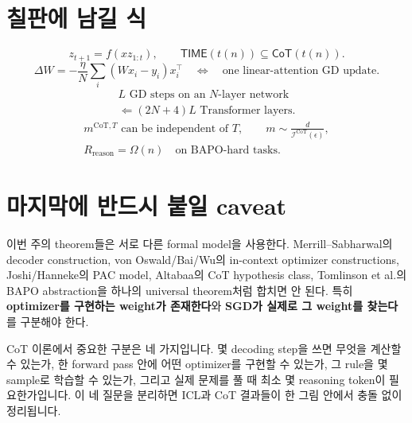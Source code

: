 \documentclass[11pt,a4paper,oneside,openany]{memoir}
\newcommand{\CoT}{\mathsf{CoT}}
\newcommand{\TIME}{\mathsf{TIME}}
\newcommand{\Icot}{\mathcal{I}^{\mathrm{CoT}}}
\theoremstyle{definition}
\begin{document}
\section{칠판에 남길 식}

\[
z_{t+1}=f(xz_{1:t}),
\qquad
\TIME(t(n))\subseteq\CoT(t(n)).
\]
\[
\Delta W
=-\frac{\eta}{N}\sum_i(Wx_i-y_i)x_i^\top
\quad\Longleftrightarrow\quad
\text{one linear-attention GD update}.
\]
\[
\begin{gathered}
L\text{ GD steps on an }N\text{-layer network}\\
\Longleftarrow (2N+4)L\text{ Transformer layers}.
\end{gathered}
\]
\[
\begin{gathered}
m^{\mathrm{CoT},T}\text{ can be independent of }T,\qquad
m\sim \frac{d}{\Icot(\epsilon)},\\
R_{\mathrm{reason}}=\Omega(n)\quad\text{on BAPO-hard tasks}.
\end{gathered}
\]

\section{마지막에 반드시 붙일 caveat}

\begin{warningbox}
이번 주의 theorem들은 서로 다른 formal model을 사용한다. Merrill--Sabharwal의 decoder construction, von Oswald/Bai/Wu의 in-context optimizer constructions, Joshi/Hanneke의 PAC model, Altabaa의 CoT hypothesis class, Tomlinson et al.의 BAPO abstraction을 하나의 universal theorem처럼 합치면 안 된다. 특히 \textbf{optimizer를 구현하는 weight가 존재한다}와 \textbf{SGD가 실제로 그 weight를 찾는다}를 구분해야 한다.
\end{warningbox}

\begin{presentbox}
CoT 이론에서 중요한 구분은 네 가지입니다. 몇 decoding step을 쓰면 무엇을 계산할 수 있는가, 한 forward pass 안에 어떤 optimizer를 구현할 수 있는가, 그 rule을 몇 sample로 학습할 수 있는가, 그리고 실제 문제를 풀 때 최소 몇 reasoning token이 필요한가입니다. 이 네 질문을 분리하면 ICL과 CoT 결과들이 한 그림 안에서 충돌 없이 정리됩니다.
\end{presentbox}

\end{document}
